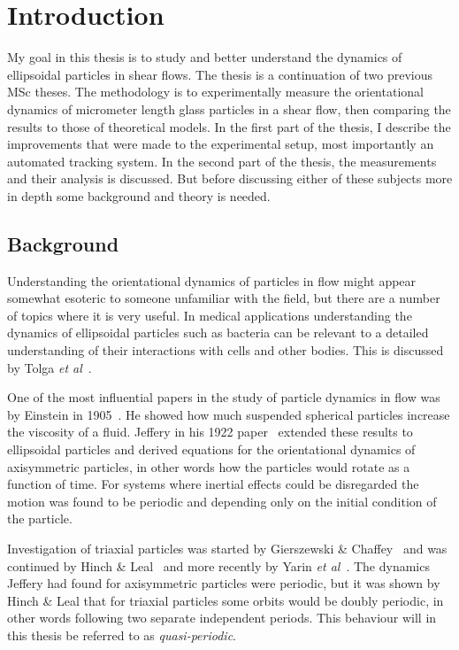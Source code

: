 \section{Introduction}
My goal in this thesis is to study and better understand the dynamics of ellipsoidal particles in shear flows. The thesis is a continuation of two previous MSc theses\cite{AntonThesis, JonasThesis}. The methodology is to experimentally measure the orientational dynamics of micrometer length glass particles in a shear flow, then comparing the results to those of theoretical models. In the first part of the thesis, I describe the improvements that were made to the experimental setup, most importantly an automated tracking system. In the second part of the thesis, the measurements and their analysis is discussed. But before discussing either of these subjects more in depth some background and theory is needed.

\subsection{Background}
Understanding the orientational dynamics of particles in flow might appear somewhat esoteric to someone unfamiliar with the field, but there are a number of topics where it is very useful. In medical applications understanding the dynamics of ellipsoidal particles such as bacteria can be relevant to a detailed understanding of their interactions with cells and other bodies. This is discussed by Tolga \emph{et al}~\cite{Tolga}. 

One of the most influential papers in the study of particle dynamics in flow was by Einstein in 1905~\cite{Einstein}. He showed how much suspended spherical particles increase the viscosity of a fluid. Jeffery in his 1922 paper~\cite{Jeffery} extended these results to ellipsoidal  particles and derived equations for the orientational dynamics of axisymmetric particles, in other words how the particles would rotate as a function of time. For systems where inertial effects could be disregarded the motion was found to be periodic and depending only on the initial condition of the particle. 

Investigation of triaxial particles was started by Gierszewski \& Chaffey~\cite{Chaffey} and was continued by Hinch \& Leal~\cite{Leal} and more recently by Yarin \emph{et al}~\cite{Yarin}. 
The dynamics Jeffery had found for axisymmetric particles were periodic, but it was shown by Hinch \& Leal that for triaxial particles some orbits would be doubly periodic, in other words following two separate independent periods. This behaviour will in this thesis be referred to as \emph{quasi-periodic}.

